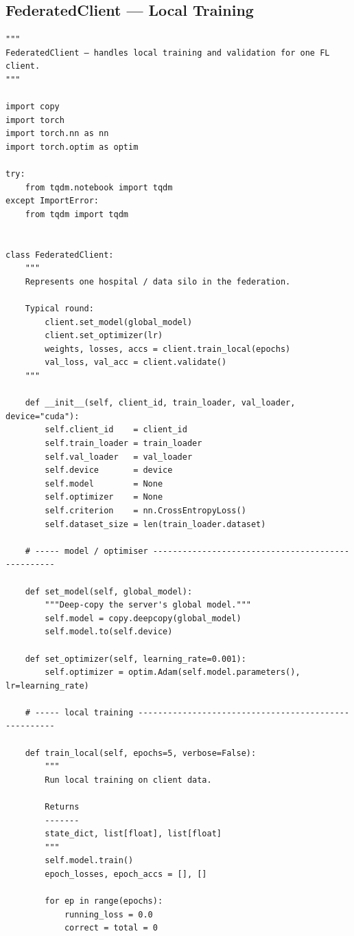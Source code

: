 \subsection{FederatedClient --- Local Training}
\begin{lstlisting}[caption={Federated Client (client.py)}, label={lst:client}]
"""
FederatedClient — handles local training and validation for one FL client.
"""

import copy
import torch
import torch.nn as nn
import torch.optim as optim

try:
    from tqdm.notebook import tqdm
except ImportError:
    from tqdm import tqdm


class FederatedClient:
    """
    Represents one hospital / data silo in the federation.

    Typical round:
        client.set_model(global_model)
        client.set_optimizer(lr)
        weights, losses, accs = client.train_local(epochs)
        val_loss, val_acc = client.validate()
    """

    def __init__(self, client_id, train_loader, val_loader, device="cuda"):
        self.client_id    = client_id
        self.train_loader = train_loader
        self.val_loader   = val_loader
        self.device       = device
        self.model        = None
        self.optimizer    = None
        self.criterion    = nn.CrossEntropyLoss()
        self.dataset_size = len(train_loader.dataset)

    # ----- model / optimiser --------------------------------------------------

    def set_model(self, global_model):
        """Deep-copy the server's global model."""
        self.model = copy.deepcopy(global_model)
        self.model.to(self.device)

    def set_optimizer(self, learning_rate=0.001):
        self.optimizer = optim.Adam(self.model.parameters(), lr=learning_rate)

    # ----- local training -----------------------------------------------------

    def train_local(self, epochs=5, verbose=False):
        """
        Run local training on client data.

        Returns
        -------
        state_dict, list[float], list[float]
        """
        self.model.train()
        epoch_losses, epoch_accs = [], []

        for ep in range(epochs):
            running_loss = 0.0
            correct = total = 0


\end{lstlisting}
